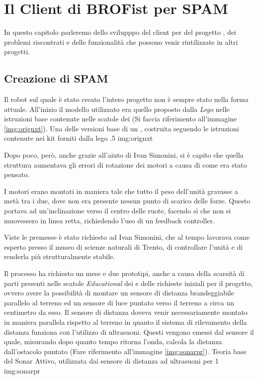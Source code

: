 \chapter{Il Client di BROFist per SPAM}
\label{chap:SPAMC}

In questo capitolo parleremo dello svilupppo del client per \SPAM{} del
progetto \BROFist{}, dei problemi riscontrati e delle funzionalità che
possono venir riutilizzate in altri progetti.

\section{Creazione di SPAM}
Il robot sul quale è stato creato l'intero progetto non è sempre stato
nella forma attuale. All'inizio il modello utilizzato era quello proposto
dalla \emph{Lego} nelle istruzioni base contenute nelle scatole dei
\nxt{} (Si faccia riferimento all'immagine \ref{img:orignxt}).
        {Una delle versioni base di un \nxt{}, costruita seguendo le
        istruzioni contenute nei kit forniti dalla lego}
        {.5}
        {img:orignxt}

Dopo poco, però, anche grazie all'aiuto di Ivan Simonini, si è capito che
quella struttura aumentava gli errori di rotazione dei motori a causa di come era
stato pensato.

I motori erano montati in maniera tale che tutto il peso dell'unità
gravasse a metà tra i due, dove non era presente nessun punto di scarico
delle forze. Questo portava ad un'inclinazione verso il centro delle ruote,
facendo sì che non si muovessero in linea retta, richiedendo l'uso di un
feedback controller.

Viste le premesse è stato richiesto ad Ivan Simonini, che al tempo lavorava
come esperto presso il museo di scienze naturali di Trento, di controllare
l'unità e di renderla più strutturalmente stabile.

Il processo ha richiesto un mese e due prototipi, anche a causa della
scarsità di parti presenti nelle scatole \emph{Educational} dei \nxt{} e
delle richieste iniziali per il progetto, ovvero avere la possibilità di
montare un sensore di distanza brandeggiabile parallelo al terreno ed un
sensore di luce puntato verso il terreno a circa un centimetro da esso.
Il sensore di distanza doveva venir necessariamente montato in maniera
parallela rispetto al terreno in quanto il sistema di rilevamento della
distanza funziona con l'utilizzo di ultrasuoni. Questi vengono emessi dal
sensore il quale, misurando dopo quanto tempo ritorna l'onda, calcola la
distanza dall'ostacolo puntato (Fare riferimento all'immagine
\ref{img:sonarpr}).
        {Teoria base del Sonar Attivo, utilizzata dai sensore di distanza
        ad ultrasuoni per \nxt{}}
        {1}
        {img:sonarpr}

